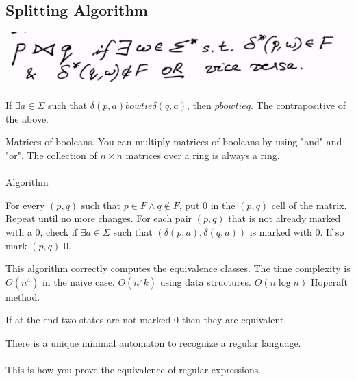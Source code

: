 \documentclass[../598comp.tex]{subfiles}
\begin{document}
\subsection{Splitting Algorithm}

\includegraphics[width=\textwidth]{splittingalgorithm}

\begin{fact}
  If $\exists a \in \Sigma$ such that $\delta(p, a) bowtie \delta(q, a)$, then $p bowtie q$. The contrapositive of the above.
\end{fact} 

Matrices of booleans. You can multiply matrices of booleans by using "and" and "or". The collection of $n \times n$ matrices over a ring is always a ring.
\\\\
Algorithm
\begin{enumerate}
  \ii
  For every $(p, q)$ such that $p \in F \wedge q \notin F$, put $0$ in the $(p, q)$ cell of the matrix.
  \ii
  Repeat until no more changes. For each pair $(p, q)$ that is not already marked with a 0, check if $\exists a \in \Sigma$ such that $(\delta(p, a), \delta(q, a))$ is marked with 0. If so mark $(p, q)$ 0.
\end{enumerate} 
This algorithm correctly computes the equivalence classes. The time complexity is $O(n^4)$ in the naive case. $O(n^2k)$ using data structures. $O(n\log n)$ Hopcraft method.

\begin{theorem}
  If at the end two states are not marked 0 then they are equivalent.
\end{theorem} 

\begin{theorem}
  There is a unique minimal automaton to recognize a regular language.
  \\\\
  This is how you prove the equivalence of regular expressions.
\end{theorem} 
\end{document}
